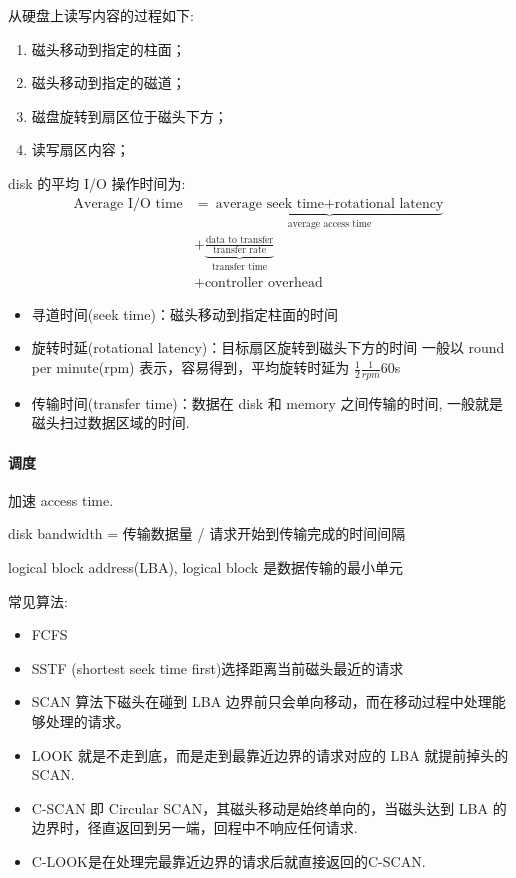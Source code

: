 从硬盘上读写内容的过程如下:
\begin{enumerate}
    \item 磁头移动到指定的柱面；
    \item 磁头移动到指定的磁道；
    \item 磁盘旋转到扇区位于磁头下方；
    \item 读写扇区内容；
\end{enumerate}

disk 的平均 I/O 操作时间为: 
{\small
\begin{align*}
    \text{Average I/O time} 
    &= \underbrace{\text{average seek time} + \text{rotational latency}}_\text{average access time} \\
    &+ \underbrace{\frac{\text{data to transfer}}{\text{transfer rate}}}_{\text{transfer time}} \\
    &+ \text{controller overhead}
\end{align*}
}
\begin{itemize}
    \item 寻道时间(seek time)：磁头移动到指定柱面的时间
    \item 旋转时延(rotational latency)：目标扇区旋转到磁头下方的时间
    \subitem 一般以 round per minute(rpm) 表示，容易得到，平均旋转时延为 $\frac{1}{2}\frac{1}{rpm}60$s
    \item 传输时间(transfer time)：数据在 disk 和 memory 之间传输的时间, 一般就是磁头扫过数据区域的时间. 
\end{itemize}

\paragraph{调度}加速 access time. 

disk bandwidth = 传输数据量 / 请求开始到传输完成的时间间隔

logical block address(LBA), logical block 是数据传输的最小单元

常见算法:
\begin{itemize}
    \item FCFS 
    \item SSTF (shortest seek time first)选择距离当前磁头最近的请求
    \item SCAN 算法下磁头在碰到 LBA 边界前只会单向移动，而在移动过程中处理能够处理的请求。
    \item LOOK 就是不走到底，而是走到最靠近边界的请求对应的 LBA 就提前掉头的SCAN. 
    \item C-SCAN 即 Circular SCAN，其磁头移动是始终单向的，当磁头达到 LBA 的边界时，径直返回到另一端，回程中不响应任何请求. 
    \item C-LOOK是在处理完最靠近边界的请求后就直接返回的C-SCAN. 
\end{itemize}

